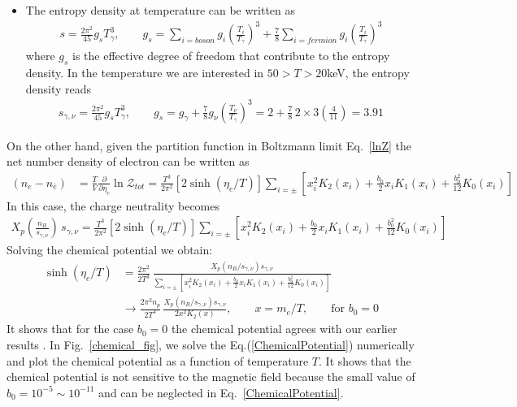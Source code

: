 \documentclass[Universe,article,submit,moreauthors,pdftex]{Definitions/mdpi}
\newcommand*{\req}[1]{Eq.~{\eqref{#1}}}
\newcommand*{\rf}[1]{Fig.~{\ref{#1}}}
\begin{document}
\begin{itemize}
  \item The entropy density at temperature can be written as \cite{Kolb:1990vq}
\begin{align}
s=\frac{2\pi^2}{45}g_sT_\gamma^3,\qquad g_s=\sum_{i=boson}g_i\left(\frac{T_i}{T_\gamma}\right)^3+\frac{7}{8}\sum_{i=fermion}g_i\left(\frac{T_i}{T_\gamma}\right)^3
\end{align}
where $g_s$ is the effective degree of freedom that contribute to the entropy density.  In the temperature we are interested in $50>T>20$keV, the entropy density reads
\begin{align}
s_{\gamma,\nu}=\frac{2\pi^2}{45}g_sT_\gamma^3,\qquad g_s=g_\gamma+\frac{7}{8}g_\nu\left(\frac{T_\nu}{T_\gamma}\right)^3=2+\frac{7}{8}\,2\times3\left(\frac{4}{11}\right)=3.91
\end{align}
\end{itemize}

 
On the other hand, given the partition function in Boltzmann limit \req{lnZ} the net number density of electron can be written as
\begin{align}
\left(n_e-n_{\bar e}\right)&=\frac{T}{V}\frac{\partial}{\partial \eta_{e}}\ln\mathcal{Z}_{tot}=\frac{T^3}{2\pi^2}\left[2\sinh{(\eta_{e}/T)}\right]\sum_{i=\pm}\left[x_i^2K_2(x_i)+\frac{b_0}{2}x_i K_1(x_i)+\frac{b^2_0}{12}K_0(x_i)\right]
\end{align}
In this case, the charge neutrality becomes
\begin{align}
X_p\left(\frac{n_B}{s_{\gamma,\nu}}\right)\,s_{\gamma,\nu}=\frac{T^3}{2\pi^2}\left[2\sinh{(\eta_{e}/T)}\right]\sum_{i=\pm}\left[x_i^2K_2(x_i)+\frac{b_0}{2}x_i K_1(x_i)+\frac{b^2_0}{12}K_0(x_i)\right]
\end{align}
Solving the chemical potential we obtain:
\begin{align}\label{ChemicalPotential}
\sinh{(\eta_{e}/T)}&=\frac{2\pi^2}{2T^3}\,\frac{X_p(n_B/s_{\gamma,\nu})s_{\gamma,\nu}}{\sum_{i=\pm}\left[x_i^2K_2(x_i)+\frac{b_0}{2}x_i K_1(x_i)+\frac{b^2_0}{12}K_0(x_i)\right]}\\
&\longrightarrow\frac{2\pi^2n_p}{2T^3}\,\frac{X_p(n_B/s_{\gamma,\nu})s_{\gamma,\nu}}{2x^2K_2(x)},\qquad x=m_e/T,\qquad \mathrm{for}\,\,b_0=0
\end{align}
It shows that for the case $b_0=0$ the chemical potential agrees with our earlier results \cite{Chris:2023abc}.
In {\rf{chemical_fig}}, we solve the Eq.(\ref{ChemicalPotential}) numerically and plot the  chemical potential as a function of temperature $T$. It shows that the chemical potential is not sensitive to the magnetic field because the small value of $b_0=10^{-5}\sim10^{-11}$ and can be neglected in \req{ChemicalPotential}. 
\end{document}
